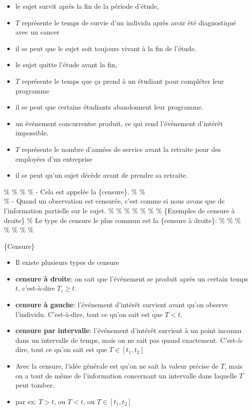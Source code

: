 \documentclass[
  11pt,
  letterpaper,
]{article}
\theoremstyle{definition}
\theoremstyle{definition}
\theoremstyle{definition}
\theoremstyle{definition}
\theoremstyle{remark}
\begin{document}
\begin{itemize}
\item
  le sujet survit après la fin de la période d'étude,
\item
  \(T\) représente le temps de survie d'un individu après avoir été diagnostiqué avec un cancer
\item
  il se peut que le sujet soit toujours vivant à la fin de l'étude.
\item
  le sujet quitte l'étude avant la fin,
\item
  \(T\) représente le temps que ça prend à un étudiant pour compléter leur programme
\item
  il se peut que certains étudiants abandonnent leur programme.
\item
  un événement concurrentse produit, ce qui rend l'événement d'intérêt impossible.
\item
  \(T\) représente le nombre d'années de service avant la retraite pour des employées d'un entreprise
\item
  il se peut qu'un sujet décède avant de prendre sa retraite.
\end{itemize}

\%
\%
\%
\% - Cela est appelée la \{censure\}.
\%
\%\\
\% - Quand un observation est censurée, c'est comme si nous avons que de l'information partielle sur le sujet.
\%
\%
\%
\%
\%
\%
\% \{Exemples de censure à droite\}
\% Le type de censure le plus commun est la \{censure à droite\}:
\%
\%
\%\\
\%
\%
\%
\%

\{Censure\}

\begin{itemize}
\item
  Il existe plusieurs types de censure
\item
  \textbf{censure à droite}: on sait que l'événement se produit après un certain temps \(t\), c'est-à-dire \(T_i \geq t\).
\item
  \textbf{censure à gauche}: l'événement d'intérêt survient avant qu'on observe l'individu. C'est-à-dire, tout ce qu'on sait est que \(T<t\).
\item
  \textbf{censure par intervalle}: l'événement d'intérêt survient à un point inconnu dans un intervalle de temps, mais on ne sait pas quand exactement. C'est-à-dire, tout ce qu'on sait est que \(T \in [t_1,t_2]\)
\item
  Avec la censure, l'idée générale est qu'on ne sait la valeur précise de \(T\), mais on a tout de même de l'information concernant un intervalle dans laquelle \(T\) peut tomber.
\item
  par ex: \(T>t\), ou \(T<t\), ou \(T \in [t_1,t_2]\)
\end{itemize}
\end{document}

